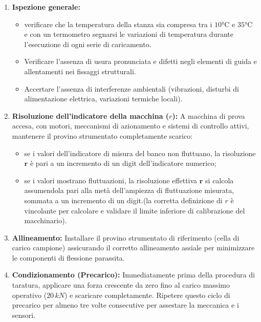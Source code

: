 \documentclass[a4paper, twoside]{article}
\begin{document}
\begin{enumerate}

    \item \textbf{Ispezione generale:}
    
    \begin{itemize}

        \item verificare che la temperatura della stanza sia compresa tra i $10$°C e $35$°C e con un termometro segnarsi le variazioni di temperatura durante l'esecuzione di ogni serie di caricamento.

        \item Verificare l'assenza di usura pronunciata e difetti negli elementi di guida e allentamenti nei fissaggi strutturali.
        
        \item Accertare l'assenza di interferenze ambientali (vibrazioni, disturbi di alimentazione elettrica, variazioni termiche locali).
        
    \end{itemize}

    \item \textbf{Risoluzione dell'indicatore della macchina ($r$):} A macchina di prova accesa, con motori, meccanismi di azionamento e sistemi di controllo attivi, mantenere il provino strumentato completamente scarico:
    
    \begin{itemize}

        \item se i valori dell'indicatore di misura del banco non fluttuano, la risoluzione $\mathbf{r}$ è pari a un incremento di un digit dell'indicatore numerico;

        \item se i valori mostrano fluttuazioni, la risoluzione effettiva $\mathbf{r}$ si calcola assumendola pari alla metà dell'ampiezza di fluttuazione misurata, sommata a un incremento di un digit.(la corretta definizione di $r$ è vincolante per calcolare e validare il limite inferiore di calibrazione del macchinario).
    
    \end{itemize}

    \item \textbf{Allineamento:} Installare il provino strumentato di riferimento (cella di carico campione) assicurando il corretto allineamento assiale per minimizzare le componenti di flessione parassita.
    
    \item \textbf{Condizionamento (Precarico):} Immediatamente prima della procedura di taratura, applicare una forza crescente da zero fino al carico massimo operativo ($20\,kN$) e scaricare completamente. Ripetere questo ciclo di precarico per almeno tre volte consecutive per assestare la meccanica e i sensori.
    

\end{enumerate}
\end{document}
